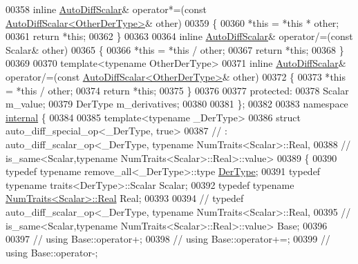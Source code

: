 \begin{DoxyCode}
00358     \textcolor{keyword}{inline} \hyperlink{class_eigen_1_1_auto_diff_scalar}{AutoDiffScalar}& operator*=(\textcolor{keyword}{const} 
      \hyperlink{class_eigen_1_1_auto_diff_scalar}{AutoDiffScalar<OtherDerType>}& other)
00359     \{
00360       *\textcolor{keyword}{this} = *\textcolor{keyword}{this} * other;
00361       \textcolor{keywordflow}{return} *\textcolor{keyword}{this};
00362     \}
00363 
00364     \textcolor{keyword}{inline} \hyperlink{class_eigen_1_1_auto_diff_scalar}{AutoDiffScalar}& operator/=(\textcolor{keyword}{const} Scalar& other)
00365     \{
00366       *\textcolor{keyword}{this} = *\textcolor{keyword}{this} / other;
00367       \textcolor{keywordflow}{return} *\textcolor{keyword}{this};
00368     \}
00369 
00370     \textcolor{keyword}{template}<\textcolor{keyword}{typename} OtherDerType>
00371     \textcolor{keyword}{inline} \hyperlink{class_eigen_1_1_auto_diff_scalar}{AutoDiffScalar}& operator/=(\textcolor{keyword}{const} 
      \hyperlink{class_eigen_1_1_auto_diff_scalar}{AutoDiffScalar<OtherDerType>}& other)
00372     \{
00373       *\textcolor{keyword}{this} = *\textcolor{keyword}{this} / other;
00374       \textcolor{keywordflow}{return} *\textcolor{keyword}{this};
00375     \}
00376 
00377   \textcolor{keyword}{protected}:
00378     Scalar m\_value;
00379     DerType m\_derivatives;
00380 
00381 \};
00382 
00383 \textcolor{keyword}{namespace }\hyperlink{namespaceinternal}{internal} \{
00384 
00385 \textcolor{keyword}{template}<\textcolor{keyword}{typename} \_DerType>
00386 \textcolor{keyword}{struct }auto\_diff\_special\_op<\_DerType, true>
00387 \textcolor{comment}{//   : auto\_diff\_scalar\_op<\_DerType, typename NumTraits<Scalar>::Real,}
00388 \textcolor{comment}{//                            is\_same<Scalar,typename NumTraits<Scalar>::Real>::value>}
00389 \{
00390   \textcolor{keyword}{typedef} \textcolor{keyword}{typename} remove\_all<\_DerType>::type \hyperlink{group___sparse_core___module}{DerType};
00391   \textcolor{keyword}{typedef} \textcolor{keyword}{typename} traits<DerType>::Scalar Scalar;
00392   \textcolor{keyword}{typedef} \textcolor{keyword}{typename} \hyperlink{group___core___module_struct_eigen_1_1_num_traits}{NumTraits<Scalar>::Real} Real;
00393 
00394 \textcolor{comment}{//   typedef auto\_diff\_scalar\_op<\_DerType, typename NumTraits<Scalar>::Real,}
00395 \textcolor{comment}{//                            is\_same<Scalar,typename NumTraits<Scalar>::Real>::value> Base;}
00396 
00397 \textcolor{comment}{//   using Base::operator+;}
00398 \textcolor{comment}{//   using Base::operator+=;}
00399 \textcolor{comment}{//   using Base::operator-;}

\end{DoxyCode}
